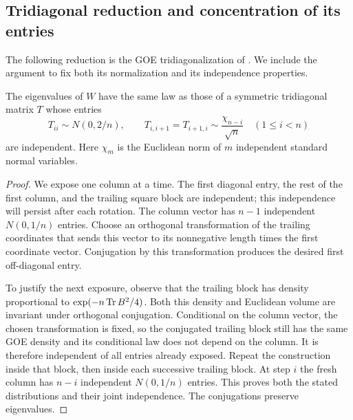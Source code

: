 \subsection{Tridiagonal reduction and concentration of its entries}

The following reduction is the GOE tridiagonalization of
\cite[Theorem~2.1]{dumitriuEdelman2002}. We include the argument to fix both its
normalization and its independence properties.

\begin{lemma}
\label{lem:tridiagonal}
The eigenvalues of $W$ have the same law as those of a symmetric
tridiagonal matrix $T$ whose entries
\[
 T_{ii}\sim N(0,2/n),\qquad
 T_{i,i+1}=T_{i+1,i}\sim\frac{\chi_{n-i}}{\sqrt n}
 \quad(1\le i<n)
\]
are independent.  Here $\chi_m$ is the Euclidean norm of $m$ independent
standard normal variables.
\end{lemma}

\begin{proof}
We expose one column at a time. The first diagonal entry, the rest of
the first column, and the trailing square block are independent; this
independence will persist after each rotation.  The column vector has $n-1$ independent $N(0,1/n)$ entries.
Choose an orthogonal transformation of the trailing coordinates that sends
this vector to its nonnegative length times the first coordinate vector.
Conjugation by this transformation produces the desired first
off-diagonal entry.

To justify the next exposure, observe that the trailing block has
density proportional to $\exp(-n\operatorname{Tr} B^2/4)$. Both this density and
Euclidean volume are invariant under orthogonal conjugation.  Conditional on the
column vector, the chosen transformation is fixed, so the conjugated
trailing block still has the same GOE density and its conditional law does
not depend on the column.  It is therefore independent of all entries
already exposed.  Repeat the construction inside that block, then inside
each successive trailing block.  At step $i$ the fresh column has $n-i$
independent $N(0,1/n)$ entries.  This proves both the stated distributions
and their joint independence.  The conjugations preserve eigenvalues.
\end{proof}

